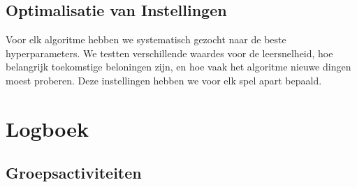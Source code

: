 \documentclass[a4paper,11pt]{report}
\begin{document}
\section{Optimalisatie van Instellingen}
Voor elk algoritme hebben we systematisch gezocht naar de beste
hyperparameters. We testten verschillende waardes voor de leersnelheid, hoe
belangrijk toekomstige beloningen zijn, en hoe vaak het algoritme nieuwe dingen
moest proberen. Deze instellingen hebben we voor elk spel apart bepaald.

\chapter{Logboek}
\small
\section*{Groepsactiviteiten}
\end{document}
